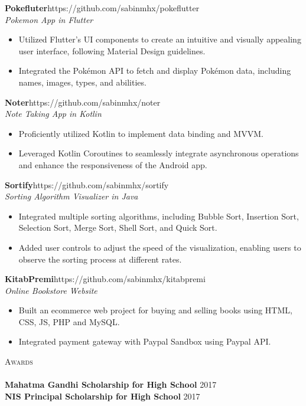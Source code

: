 \documentclass[a4paper]{article}
\newcommand{\lineunder} {
    \vspace*{-8pt} \\
    \hspace*{-18pt} \hrulefill \\
}
\newcommand{\header} [1] {
    {\hspace*{-18pt}\vspace*{6pt} \textsc{#1}}
    \vspace*{-6pt} \lineunder
}
\begin{document}
\vspace*{2mm}

{\textbf{Pokefluter}}\hfill https://github.com/sabinmhx/pokeflutter\\
\textit{Pokemon App in Flutter}
\begin{itemize} \itemsep 1pt
	\item Utilized Flutter's UI components to create an intuitive and visually appealing user interface, following Material Design guidelines.  
	\item Integrated the Pokémon API to fetch and display Pokémon data, including names, images, types, and abilities.
\end{itemize}
\vspace*{2mm}

{\textbf{Noter}}\hfill https://github.com/sabinmhx/noter\\
\textit{Note Taking App in Kotlin}
\begin{itemize} \itemsep 1pt
	\item Proficiently utilized Kotlin to implement data binding and MVVM. 
	\item Leveraged Kotlin Coroutines to seamlessly integrate asynchronous operations and enhance the responsiveness of the Android app.
\end{itemize}
\vspace*{2mm}

{\textbf{Sortify}}\hfill https://github.com/sabinmhx/sortify\\
\textit{Sorting Algorithm Visualizer in Java}
\begin{itemize} \itemsep 1pt
	\item Integrated multiple sorting algorithms, including Bubble Sort, Insertion Sort, Selection Sort, Merge Sort, Shell Sort, and Quick Sort.
	\item Added user controls to adjust the speed of the visualization, enabling users to observe the sorting process at different rates.
\end{itemize}
\vspace*{2mm}


{\textbf{KitabPremi}}\hfill https://github.com/sabinmhx/kitabpremi\\
\textit{Online Bookstore Website}
\begin{itemize} \itemsep 1pt
	\item Built an ecommerce web project for buying and selling books using HTML, CSS, JS, PHP and MySQL.  
	\item Integrated payment gateway with Paypal Sandbox using Paypal API.
\end{itemize}
\vspace*{2mm}

\header{Awards}
\textbf{Mahatma Gandhi Scholarship for High School} \hfill 2017\\
\vspace*{2mm}
\textbf{NIS Principal Scholarship for High School} \hfill 2017\\
\vspace*{2mm}

\ 
\end{document}
